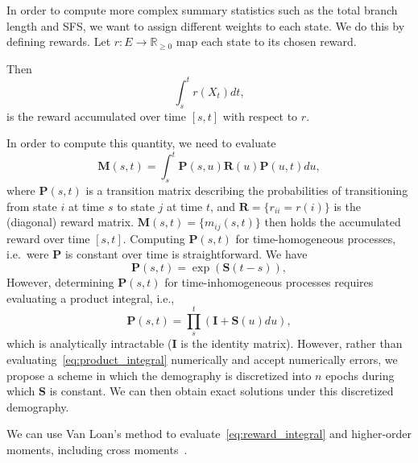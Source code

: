 \documentclass[hidelinks,11pt]{article}
\begin{document}
    In order to compute more complex summary statistics such as the total branch length and SFS, we want to assign different weights to each state.
    We do this by defining rewards.
    Let $r: E \rightarrow \mathbb{R}_{\geq 0}$ map each state to its chosen reward.

    Then
    \begin{equation*}
        \int_s^{t} r(X_t) dt,
    \end{equation*}
    is the reward accumulated over time $[s, t]$ with respect to $r$.

    In order to compute this quantity, we need to evaluate
    \begin{equation}
        \label{eq:reward_integral}
        \mathbf{M}(s,t)=\int_s^t \mathbf{P}(s,u)\mathbf{R}(u)\mathbf{P}(u,t) du,
    \end{equation}
    where $\mathbf{P}(s,t)$ is a transition matrix describing the probabilities of transitioning from state $i$ at time $s$ to state $j$ at time $t$, and $\mathbf{R}=\{r_{ii}=r(i)\}$ is the (diagonal) reward matrix.
    $\mathbf{M}(s,t)=\{m_{ij}(s,t)\}$ then holds the accumulated reward over time $[s, t]$.
    Computing $\mathbf{P}(s,t)$ for time-homogeneous processes, i.e.\ were $\mathbf{P}$ is constant over time is straightforward.
    We have
    \begin{equation*}
        \mathbf{P}(s,t) = \exp(\mathbf{S}(t-s)),
    \end{equation*}
    However, determining $\mathbf{P}(s,t)$ for time-inhomogeneous processes requires evaluating a product integral, i.e.,
    \begin{equation} %
        \label{eq:product_integral}
        \mathbf{P}(s,t) = \prod_s^t (\mathbf{I} + \mathbf{S}(u) du),
    \end{equation}
    which is analytically intractable ($\mathbf{I}$ is the identity matrix).
    However, rather than evaluating~\eqref{eq:product_integral} numerically and accept numerically errors, we propose a scheme in which the demography is discretized into $n$ epochs during which $\mathbf{S}$ is constant.
    We can then obtain exact solutions under this discretized demography.

    We can use Van Loan's method to evaluate~\eqref{eq:reward_integral} and higher-order moments, including cross moments~\citep{van_loan_popgen,van_loan}.
\end{document}

